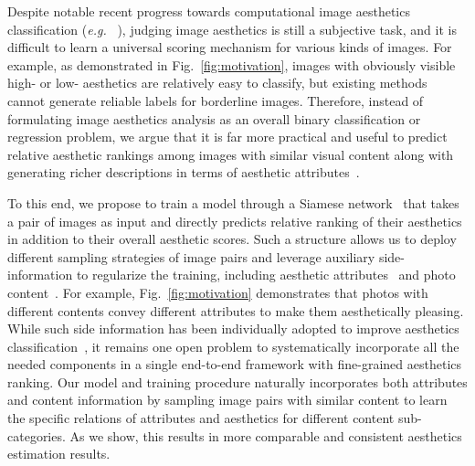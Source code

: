 \documentclass[runningheads]{llncs}
\def\eg{\emph{e.g. }}
\begin{document}
Despite notable recent progress towards computational image aesthetics classification (\eg~\cite{lu2014rapid,marchesotti2014discovering,xin2015iccv}),
judging image aesthetics is still a subjective task,
and it is difficult to learn a universal scoring mechanism for various kinds of images.
For example,
as demonstrated in Fig.~\ref{fig:motivation},
images with obviously visible high- or low- aesthetics are relatively easy to classify,
but existing methods cannot generate reliable labels for borderline images.
Therefore,
instead of formulating image aesthetics analysis as an overall binary classification or regression problem,
we argue that it is far more practical and useful to predict relative aesthetic
rankings among images with similar visual content along with generating richer
descriptions in terms of aesthetic attributes~\cite{Geng2011WebSearch,san2012leveraging}.

To this end,
we propose to train a model through a Siamese network~\cite{chopra2005learning} that takes a pair of images as input and directly predicts relative ranking of their aesthetics in addition to their overall aesthetic scores.
Such a structure allows us to deploy different sampling strategies of image pairs and leverage auxiliary side-information to regularize the training,
including aesthetic attributes~\cite{dhar2011high,lu2014rapid,marchesotti2014discovering} and photo content~\cite{luo2011content,murray2012ava,xin2015TMM}.
For example,
Fig.~\ref{fig:motivation} demonstrates that photos with different contents convey different attributes to make them aesthetically pleasing.
While such side information has been individually adopted to improve aesthetics classification~\cite{lu2014rapid,marchesotti2014discovering},
it remains one open problem to systematically incorporate all the needed components in a single end-to-end framework with fine-grained aesthetics ranking.
Our model and training procedure naturally incorporates both attributes and content information by
sampling image pairs with similar content to learn the specific relations of attributes and aesthetics for different content sub-categories.
As we show, this results in more comparable and consistent aesthetics estimation results.
\end{document}
